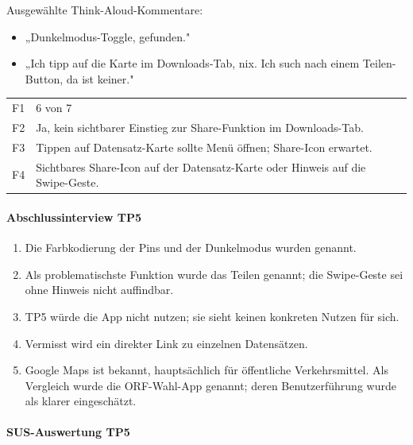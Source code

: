 \documentclass{article}
\begin{document}
Ausgewählte Think-Aloud-Kommentare:
\begin{itemize}
  \item „Dunkelmodus-Toggle, gefunden."
  \item „Ich tipp auf die Karte im Downloads-Tab, nix. Ich such nach
        einem Teilen-Button, da ist keiner."
\end{itemize}

\begin{tabular}{@{}lp{10cm}@{}}
  F1 & 6 von 7 \\
  F2 & Ja, kein sichtbarer Einstieg zur Share-Funktion im Downloads-Tab. \\
  F3 & Tippen auf Datensatz-Karte sollte Menü öffnen; Share-Icon erwartet. \\
  F4 & Sichtbares Share-Icon auf der Datensatz-Karte oder Hinweis
       auf die Swipe-Geste. \\
\end{tabular}

\paragraph{Abschlussinterview TP5}

\begin{enumerate}
  \item Die Farbkodierung der Pins und der Dunkelmodus wurden genannt.
  \item Als problematischste Funktion wurde das Teilen genannt; die
        Swipe-Geste sei ohne Hinweis nicht auffindbar.
  \item TP5 würde die App nicht nutzen; sie sieht keinen konkreten
        Nutzen für sich.
  \item Vermisst wird ein direkter Link zu einzelnen Datensätzen.
  \item Google Maps ist bekannt, hauptsächlich für öffentliche Verkehrsmittel.
        Als Vergleich wurde die ORF-Wahl-App genannt; deren Benutzerführung
        wurde als klarer eingeschätzt.
\end{enumerate}

\paragraph{SUS-Auswertung TP5}
\end{document}
